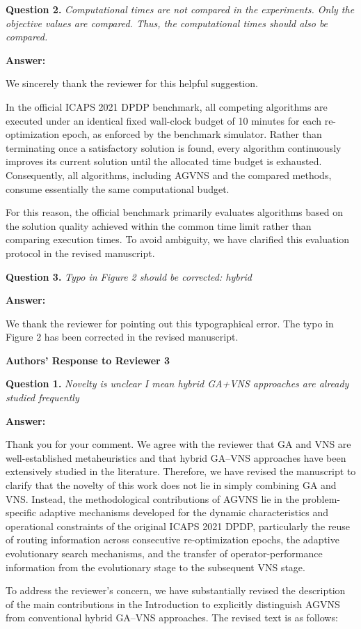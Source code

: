 \documentclass[11pt]{article}
\newcommand{\question}[2]{\vspace{0.5em}\noindent\textbf{Question #1.} \emph{#2}\par}
\newcommand{\answer}{\noindent\textbf{Answer:}\par}
\begin{document}
\question{2}{Computational times are not compared in the experiments. Only the objective values are compared. Thus, the computational times should also be compared.}
\answer
We sincerely thank the reviewer for this helpful suggestion.

In the official ICAPS 2021 DPDP benchmark, all competing algorithms are executed under an identical fixed wall-clock budget of 10 minutes for each re-optimization epoch, as enforced by the benchmark simulator. Rather than terminating once a satisfactory solution is found, every algorithm continuously improves its current solution until the allocated time budget is exhausted. Consequently, all algorithms, including AGVNS and the compared methods, consume essentially the same computational budget.

For this reason, the official benchmark primarily evaluates algorithms based on the solution quality achieved within the common time limit rather than comparing execution times. To avoid ambiguity, we have clarified this evaluation protocol in the revised manuscript.

\question{3}{Typo in Figure 2 should be corrected: hybrid}
\answer
We thank the reviewer for pointing out this typographical error. The typo in Figure 2 has been corrected in the revised manuscript.

\newpage
\begin{center}
\textbf{\Large Authors' Response to Reviewer 3}
\end{center}

\question{1}{Novelty is unclear I mean hybrid GA+VNS approaches are already studied frequently}
\answer
Thank you for your comment. We agree with the reviewer that GA and VNS are well-established metaheuristics and that hybrid GA--VNS approaches have been extensively studied in the literature. Therefore, we have revised the manuscript to clarify that the novelty of this work 
does not lie in simply combining GA and VNS. Instead, the methodological contributions of AGVNS lie in the problem-specific adaptive mechanisms developed for the dynamic characteristics and operational constraints of the original ICAPS 2021 DPDP, particularly the reuse of routing information across consecutive re-optimization epochs, the adaptive evolutionary search mechanisms, and the transfer of operator-performance information from the evolutionary stage to the subsequent VNS stage.

To address the reviewer's concern, we have substantially revised the description of the main contributions in the Introduction to explicitly distinguish AGVNS from conventional hybrid GA--VNS approaches. The revised 
text is as follows:
\end{document}
